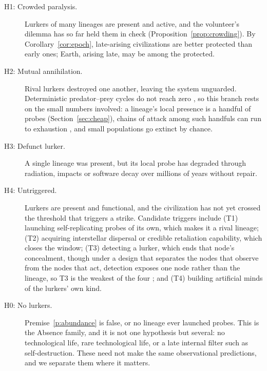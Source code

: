 \documentclass[preprint,12pt]{elsarticle}
\theoremstyle{definition}
\begin{document}
\begin{description}
  \item[H1: Crowded paralysis.] Lurkers of many lineages are present and active, and the volunteer's dilemma has so far held them in check (Proposition~\ref{prop:crowding}). By Corollary~\ref{cor:epoch}, late-arising civilizations are better protected than early ones; Earth, arising late, may be among the protected.
  \item[H2: Mutual annihilation.] Rival lurkers destroyed one another, leaving the system unguarded. Deterministic predator--prey cycles do not reach zero \citep{Forgan2019}, so this branch rests on the small numbers involved: a lineage's local presence is a handful of probes (Section~\ref{sec:cheap}), chains of attack among such handfuls can run to exhaustion \citep{SandbergArmstrong2013}, and small populations go extinct by chance.
  \item[H3: Defunct lurker.] A single lineage was present, but its local probe has degraded through radiation, impacts or software decay over millions of years without repair.
  \item[H4: Untriggered.] Lurkers are present and functional, and the civilization has not yet crossed the threshold that triggers a strike. Candidate triggers include (T1) launching self-replicating probes of its own, which makes it a rival lineage; (T2) acquiring interstellar dispersal or credible retaliation capability, which closes the window; (T3) detecting a lurker, which ends that node's concealment, though under a design that separates the nodes that observe from the nodes that act, detection exposes one node rather than the lineage, so T3 is the weakest of the four \citep{Lopin2026b}; and (T4) building artificial minds of the lurkers' own kind.
  \item[H0: No lurkers.] Premise~\ref{p:abundance} is false, or no lineage ever launched probes. This is the Absence family, and it is not one hypothesis but several: no technological life, rare technological life, or a late internal filter such as self-destruction. These need not make the same observational predictions, and we separate them where it matters.
\end{description}
\end{document}

